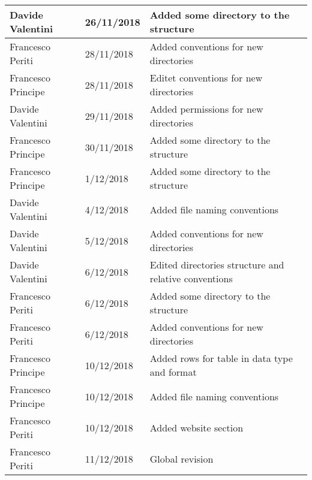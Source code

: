 \begin{table}[H]
\begin{tabularx}{\textwidth}{|l|l|X|}
Davide Valentini & 26/11/2018 & Added some directory to the structure\\ \hline
Francesco Periti & 28/11/2018 & Added conventions for new directories\\ \hline
Francesco Principe & 28/11/2018 & Editet conventions for new directories\\ \hline
Davide Valentini & 29/11/2018 & Added permissions for new directories\\ \hline
Francesco Principe & 30/11/2018 & Added some directory to the structure\\ \hline
Francesco Principe & 1/12/2018 & Added some directory to the structure\\ \hline
Davide Valentini & 4/12/2018 & Added file naming conventions\\ \hline
Davide Valentini & 5/12/2018 & Added conventions for new directories\\ \hline
Davide Valentini & 6/12/2018 & Edited directories structure and relative conventions\\ \hline
Francesco Periti & 6/12/2018 & Added some directory to the structure\\ \hline
Francesco Periti & 6/12/2018 & Added conventions for new directories\\ \hline
Francesco Principe & 10/12/2018 &  Added rows for table in data type and format\\ \hline
Francesco Principe & 10/12/2018 & Added file naming conventions\\ \hline
Francesco Periti & 10/12/2018 & Added website section\\ \hline
Francesco Periti & 11/12/2018 & Global revision\\ \hline

\end{tabularx}
\end{table}
